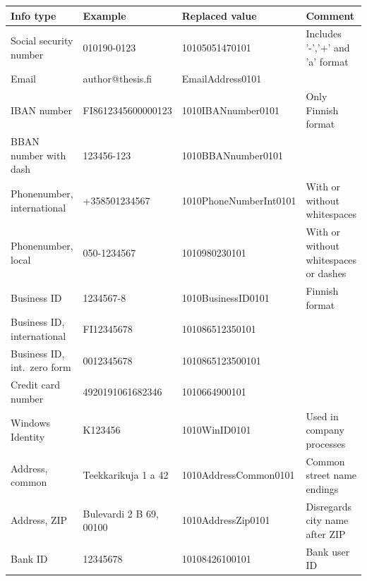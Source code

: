 \begin{table}[]\small
    \tabcolsep=0.11cm
    \begin{tabularx}{\textwidth}{|L{0.17\textwidth}|L{0.27\textwidth}|L{0.30\textwidth}|Y|}
        \hline
        \textbf{Info type} &
        \textbf{Example} &
        \textbf{Replaced value} &
        \textbf{Comment}
        \\ \hline
        Social security number &
        010190-0123 &
        10105051470101 &
        Includes '-','+' and 'a' format
        \\ \hline
        Email &
        author@thesis.fi &
        EmailAddress0101 &
        \\ \hline
        IBAN number &
        FI8612345600000123 &
        1010IBANnumber0101 &
        Only Finnish format
        \\ \hline
        BBAN number with dash &
        123456-123 &
        1010BBANnumber0101 &
        \\ \hline
        Phonenumber, international &
        +358501234567 &
        1010PhoneNumberInt0101 &
        With or without whitespaces
        \\ \hline
        Phonenumber, local &
        050-1234567 &
        1010980230101 &
        With or without whitespaces or dashes
        \\ \hline
        Business ID &
        1234567-8 &
        1010BusinessID0101 &
        Finnish format
        \\ \hline
        Business ID, international &
        FI12345678 &
        101086512350101 &
        \\ \hline
        Business ID, int.\ zero form &
        0012345678 &
        1010865123500101 &
        \\ \hline
        Credit card number &
        4920191061682346 &
        1010664900101 &
        \\ \hline
        Windows Identity &
        K123456 &
        1010WinID0101 &
        Used in company processes
        \\ \hline
        Address, common &
        Teekkarikuja 1 a 42 &
        1010AddressCommon0101 &
        Common street name endings
        \\ \hline
        Address, ZIP &
        Bulevardi 2 B 69, 00100 &
        1010AddressZip0101 &
        Disregards city name after ZIP
        \\ \hline
        Bank ID &
        12345678 &
        10108426100101 &
        Bank user ID
        \\ \hline

\end{tabularx}
\end{table}
